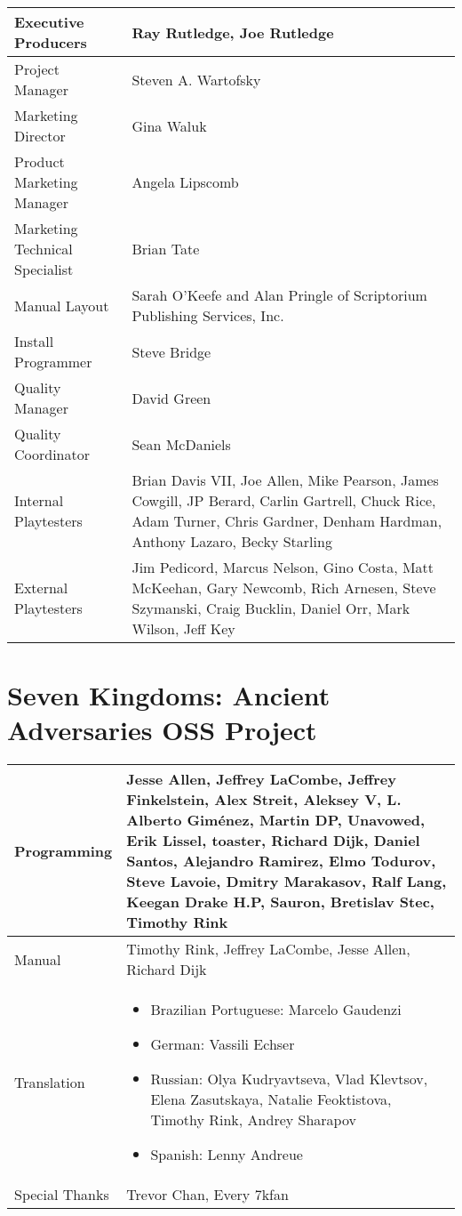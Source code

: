 \begin{center}
\begin{tabular}{|p{1.5in}|p{2.5in}|}
	\hline
	Executive Producers	& Ray Rutledge, Joe Rutledge \\ \hline
Project Manager	& Steven A. Wartofsky \\ \hline
Marketing Director	& Gina Waluk \\ \hline
Product Marketing Manager	& Angela Lipscomb \\ \hline
Marketing Technical Specialist	& Brian Tate \\ \hline
Manual Layout	& Sarah O’Keefe and Alan Pringle of Scriptorium Publishing Services, Inc. \\ \hline
Install Programmer	& Steve Bridge \\ \hline
Quality Manager	& David Green \\ \hline
Quality Coordinator	& Sean McDaniels \\ \hline
Internal Playtesters	& Brian Davis VII, Joe Allen, Mike Pearson, James Cowgill, JP Berard, Carlin Gartrell, Chuck Rice, Adam Turner, Chris Gardner, Denham Hardman, Anthony Lazaro, Becky Starling \\ \hline
External Playtesters	& Jim Pedicord, Marcus Nelson, Gino Costa, Matt McKeehan, Gary Newcomb, Rich Arnesen, Steve Szymanski, Craig Bucklin, Daniel Orr, Mark Wilson, Jeff Key \\ \hline
\end{tabular}
\end{center}

\clearpage

\section{Seven Kingdoms: Ancient Adversaries OSS Project}

\begin{center}
\begin{tabular}{|p{1in}|p{3in}|}
	\hline
	Programming	& Jesse Allen, Jeffrey LaCombe, Jeffrey Finkelstein, Alex Streit, Aleksey V, L. Alberto Giménez, Martin DP, Unavowed, Erik Lissel, toaster, Richard Dijk, Daniel Santos, Alejandro Ramirez, Elmo Todurov, Steve Lavoie, Dmitry Marakasov, Ralf Lang, Keegan Drake H.P, Sauron, Bretislav Stec, Timothy Rink \\ \hline
Manual & Timothy Rink, Jeffrey LaCombe, Jesse Allen, Richard Dijk \\ \hline
Translation	& 
\begin{itemize}
\item Brazilian Portuguese: Marcelo Gaudenzi
\item German: Vassili Echser
\item Russian: Olya Kudryavtseva, Vlad Klevtsov, Elena Zasutskaya, Natalie Feoktistova, Timothy Rink, Andrey Sharapov
\item Spanish: Lenny Andreue
\end{itemize}
 \\ \hline
Special Thanks & Trevor Chan, Every 7kfan \\ \hline
\end{tabular}
\end{center}
